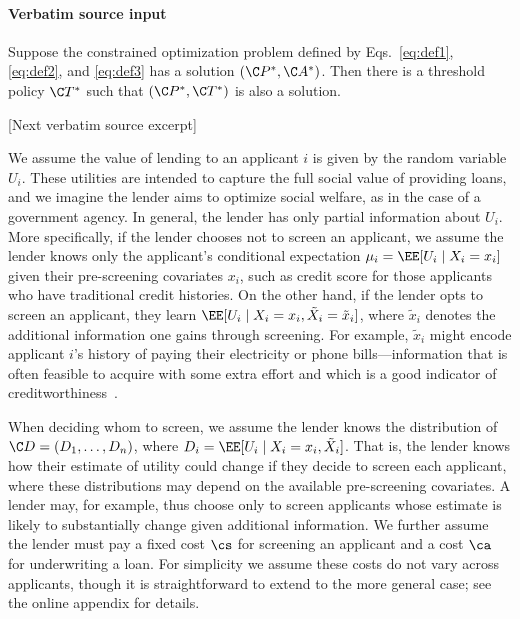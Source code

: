 \documentclass[10pt]{article}
\begin{document}
\paragraph{Verbatim source input}
\begin{ReviewVerbatim}
\begin{thm}
\label{thm:main}
    Suppose the constrained optimization problem defined by Eqs.~\eqref{eq:def1}, \eqref{eq:def2}, and \eqref{eq:def3} has a solution \((\C P^*, \C A^*)\). Then there is a threshold policy \(\C T^*\) such that \((\C P^*, \C T^*)\) is also a solution.
\end{thm}

[Next verbatim source excerpt]

We assume the value of lending to an applicant \(i\) is given by the random variable \(U_i\).
These utilities are intended to capture the full social value of providing loans, and we imagine the lender aims to optimize social welfare, as in the case of a government agency.
In general, the lender has only partial information about \(U_i\). More specifically, if the lender chooses not to screen an applicant, we assume the lender knows only the applicant's conditional expectation \(\mu_i = \EE [U_i \mid X_i = x_i]\)
given their pre-screening covariates \(x_i\), such as credit score for those applicants who have traditional credit histories.
On the other hand, if the lender opts to screen an applicant, they learn \(\EE[U_i \mid X_i = x_i, \tilde{X}_i = \tilde{x}_i]\), where \(\tilde{x}_i\) denotes the additional information one gains through screening.
For example, \(\tilde{x}_i\) might encode applicant \(i\)'s history of paying
their electricity or phone bills---information that is often feasible to acquire with some extra effort and which is a good indicator of creditworthiness~\cite{fdic2018}.

When deciding whom to screen, we assume
the lender knows the distribution of \(\C D = (D_1, \ldots, D_n)\), where \(D_i = \EE[U_i \mid X_i = x_i, \tilde{X}_i]\).
That is, the lender knows how their estimate of utility could change if they decide to screen each applicant, where these distributions may depend on the available pre-screening covariates.
A lender may, for example, thus choose only to screen applicants whose estimate is likely to substantially change given additional information.
We further assume the lender must pay a
fixed cost \(\cs\) for screening an applicant
and a cost \(\ca\) for underwriting a loan.
For simplicity we assume these costs do not vary across applicants, though it is straightforward to extend to the more general case; see the online appendix for details.


\end{ReviewVerbatim}
\end{document}
